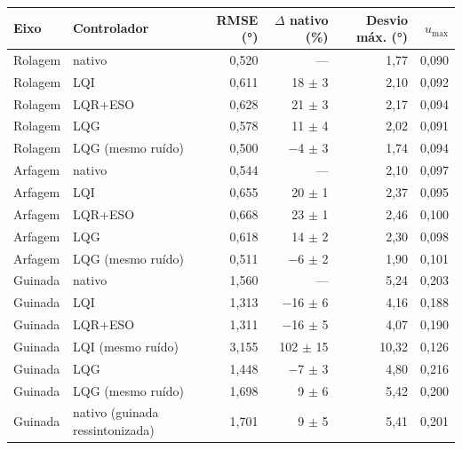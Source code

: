 \begin{tabular}{llrrrr}
\toprule
Eixo & Controlador & RMSE (\si{\degree}) & $\Delta$ nativo (\%) & Desvio máx. (\si{\degree}) & $u_{\max}$ \\
\midrule
Rolagem & nativo & 0,520 & --- & 1,77 & 0,090 \\
Rolagem & LQI & 0,611 & 18 $\pm$ 3 & 2,10 & 0,092 \\
Rolagem & LQR+ESO & 0,628 & 21 $\pm$ 3 & 2,17 & 0,094 \\
Rolagem & LQG & 0,578 & 11 $\pm$ 4 & 2,02 & 0,091 \\
Rolagem & LQG (mesmo ruído) & 0,500 & $-$4 $\pm$ 3 & 1,74 & 0,094 \\
\addlinespace
Arfagem & nativo & 0,544 & --- & 2,10 & 0,097 \\
Arfagem & LQI & 0,655 & 20 $\pm$ 1 & 2,37 & 0,095 \\
Arfagem & LQR+ESO & 0,668 & 23 $\pm$ 1 & 2,46 & 0,100 \\
Arfagem & LQG & 0,618 & 14 $\pm$ 2 & 2,30 & 0,098 \\
Arfagem & LQG (mesmo ruído) & 0,511 & $-$6 $\pm$ 2 & 1,90 & 0,101 \\
\addlinespace
Guinada & nativo & 1,560 & --- & 5,24 & 0,203 \\
Guinada & LQI & 1,313 & $-$16 $\pm$ 6 & 4,16 & 0,188 \\
Guinada & LQR+ESO & 1,311 & $-$16 $\pm$ 5 & 4,07 & 0,190 \\
Guinada & LQI (mesmo ruído) & 3,155 & 102 $\pm$ 15 & 10,32 & 0,126 \\
Guinada & LQG & 1,448 & $-$7 $\pm$ 3 & 4,80 & 0,216 \\
Guinada & LQG (mesmo ruído) & 1,698 & 9 $\pm$ 6 & 5,42 & 0,200 \\
Guinada & nativo (guinada ressintonizada) & 1,701 & 9 $\pm$ 5 & 5,41 & 0,201 \\
\bottomrule
\end{tabular}
